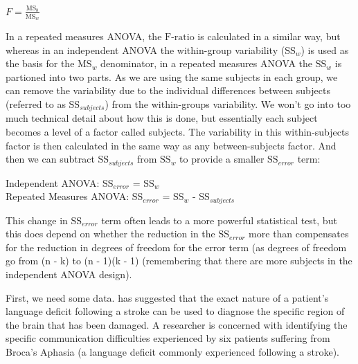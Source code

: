 \begin{center}
$F = \displaystyle\frac{ \mbox{MS}_b }{ \mbox{MS}_w }$ 
\end{center}

In a repeated measures ANOVA, the $\mbox{F-ratio}$ is calculated in a similar way, but whereas in an independent ANOVA the within-group variability ($\mbox{SS}_w$) is used as the basis for the $\mbox{MS}_w$ denominator, in a repeated measures ANOVA the $\mbox{SS}_w$ is partioned into two parts. As we are using the same subjects in each group, we can remove the variability due to the individual differences between subjects (referred to as $\mbox{SS}_{subjects}$) from the within-groups variability. We won't go into too much technical detail about how this is done, but essentially each subject becomes a level of a factor called subjects. The variability in this within-subjects factor is then calculated in the same way as any between-subjects factor. And then we can subtract $\mbox{SS}_{subjects}$ from $\mbox{SS}_w$ to provide a smaller $\mbox{SS}_{error}$ term: 

\begin{center}
Independent ANOVA: $\mbox{SS}_{error}$ = $\mbox{SS}_w$ \\ \vspace{0.3cm}
Repeated Measures ANOVA: $\mbox{SS}_{error}$ = $\mbox{SS}_w$ - $\mbox{SS}_{subjects}$
\end{center}

This change in $\mbox{SS}_{error}$ term often leads to a more powerful statistical test, but this does depend on whether the reduction in the $\mbox{SS}_{error}$ more than compensates for the reduction in degrees of freedom for the error term (as degrees of freedom go from (n - k) to (n - 1)(k - 1) (remembering that there are more subjects in the independent ANOVA design).


First, we need some data. \textcite{Geschwind1972} has suggested that the exact nature of a patient’s language deficit following a stroke can be used to diagnose the specific region of the brain that has been damaged. A researcher is concerned with identifying the specific communication difficulties experienced by six patients suffering from Broca’s Aphasia (a language deficit commonly experienced following a stroke). 

